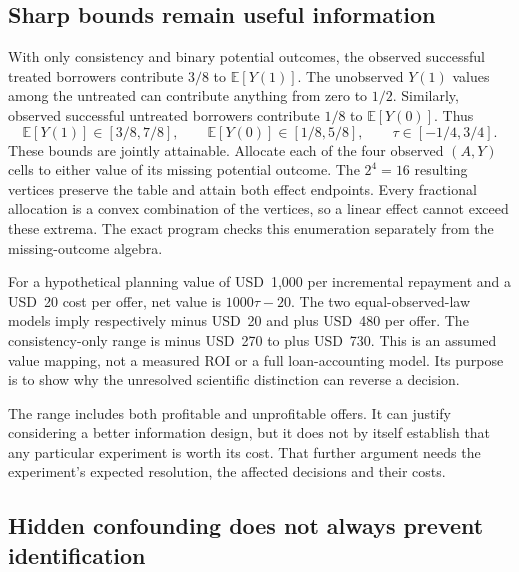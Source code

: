 \subsection{Sharp bounds remain useful information}

With only consistency and binary potential outcomes, the observed successful
treated borrowers contribute $3/8$ to $\mathbb E[Y(1)]$. The unobserved
$Y(1)$ values among the untreated can contribute anything from zero to $1/2$.
Similarly, observed successful untreated borrowers contribute $1/8$ to
$\mathbb E[Y(0)]$. Thus
\[
 \mathbb E[Y(1)]\in[3/8,7/8],\qquad
 \mathbb E[Y(0)]\in[1/8,5/8],\qquad
 \tau\in[-1/4,3/4].
\]
These bounds are jointly attainable. Allocate each of the four observed
$(A,Y)$ cells to either value of its missing potential outcome. The $2^4=16$
resulting vertices preserve the table and attain both effect endpoints.
Every fractional allocation is a convex combination of the vertices, so a
linear effect cannot exceed these extrema. The exact program checks this
enumeration separately from the missing-outcome algebra.

For a hypothetical planning value of USD~1,000 per incremental repayment and
a USD~20 cost per offer, net value is $1000\tau-20$. The two equal-observed-law
models imply respectively minus USD~20 and plus USD~480 per offer. The
consistency-only range is minus USD~270 to plus USD~730. This is an assumed
value mapping, not a measured ROI or a full loan-accounting model. Its purpose
is to show why the unresolved scientific distinction can reverse a decision.

The range includes both profitable and unprofitable offers. It can justify
considering a better information design, but it does not by itself establish
that any particular experiment is worth its cost. That further argument needs
the experiment's expected resolution, the affected decisions and their costs.

\subsection{Hidden confounding does not always prevent identification}

